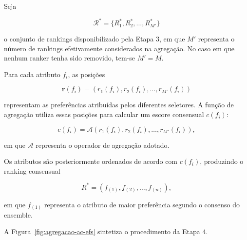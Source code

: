 Seja

\begin{equation}
    \mathcal{R}^{*}
    =
    \{R^{*}_1,R^{*}_2,\ldots,R^{*}_{M'}\}
\end{equation}

o conjunto de rankings disponibilizado pela Etapa 3, em que $M'$ representa o
número de rankings efetivamente considerados na agregação. No caso em que
nenhum ranker tenha sido removido, tem-se $M'=M$.

Para cada atributo $f_i$, as posições

\begin{equation}
    \mathbf{r}(f_i)
    =
    \left(
        r_1(f_i),
        r_2(f_i),
        \ldots,
        r_{M'}(f_i)
    \right)
\end{equation}

representam as preferências atribuídas pelos diferentes seletores. A função de
agregação utiliza essas posições para calcular um escore consensual
$c(f_i)$:

\begin{equation}
    c(f_i)
    =
    \mathcal{A}
    \left(
        r_1(f_i),
        r_2(f_i),
        \ldots,
        r_{M'}(f_i)
    \right),
    \label{eq:agregacao-geral-ac-efs}
\end{equation}

em que $\mathcal{A}$ representa o operador de agregação adotado.

Os atributos são posteriormente ordenados de acordo com $c(f_i)$, produzindo
o ranking consensual

\begin{equation}
    R^{*}
    =
    \left(
        f_{(1)},f_{(2)},\ldots,f_{(n)}
    \right),
    \label{eq:ranking-consensual-ac-efs}
\end{equation}

em que $f_{(1)}$ representa o atributo de maior preferência segundo o
consenso do ensemble.

A Figura~\ref{fig:agregacao-ac-efs} sintetiza o procedimento da Etapa 4.

